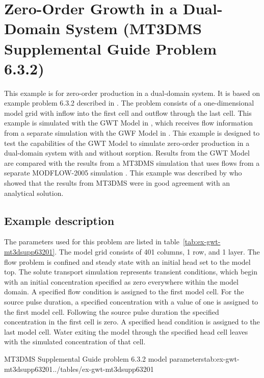 \section{Zero-Order Growth in a Dual-Domain System (MT3DMS Supplemental Guide Problem 6.3.2)}

This example is for zero-order production in a dual-domain system.  It is based on example problem 6.3.2 described in \cite{zheng2010mt3dmsv5.3}.  The problem consists of a one-dimensional model grid with inflow into the first cell and outflow through the last cell.  This example is simulated with the GWT Model in \mf, which receives flow information from a separate simulation with the GWF Model in \mf.  This example is designed to test the capabilities of the GWT Model to simulate zero-order production in a dual-domain system with and without sorption.  Results from the GWT Model are compared with the results from a MT3DMS simulation \citep{zheng1990mt3d} that uses flows from a separate MODFLOW-2005 simulation \citep{modflow2005}.  This example was described by \cite{zheng2010mt3dmsv5.3} who showed that the results from MT3DMS were in good agreement with an analytical solution.

\subsection{Example description}

The parameters used for this problem are listed in table~\ref{tab:ex-gwt-mt3dsupp63201}.  The model grid consists of 401 columns, 1 row, and 1 layer.  The flow problem is confined and steady state with an initial head set to the model top.  The solute transport simulation represents transient conditions, which begin with an initial concentration specified as zero everywhere within the model domain.  A specified flow condition is assigned to the first model cell.  For the source pulse duration, a specified concentration with a value of one is assigned to the first model cell.  Following the source pulse duration the specified concentration in the first cell is zero.  A specified head condition is assigned to the last model cell.  Water exiting the model through the specified head cell leaves with the simulated concentration of that cell.

\begin{StandardTable}{MT3DMS Supplemental Guide problem 6.3.2 model parameters}{tab:ex-gwt-mt3dsupp63201}{../tables/ex-gwt-mt3dsupp63201}
\end{StandardTable}

